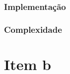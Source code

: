 \documentclass[11pt]{article}
\begin{document}
\subsubsection{Implementação}
\label{sec-2-1-1}

\subsubsection{Complexidade}
\label{sec-2-1-2}

\section{Item b}
\label{sec-3}
\end{document}
